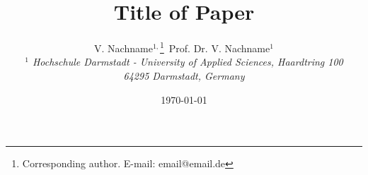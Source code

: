 \documentclass[a4paper,10pt,notitlepage,twocolumn,oneside]{article}
\begin{document}
\title{Title of Paper}
\author{V. Nachname$^{1,}$\thanks{Corresponding author. E-mail: email@email.de}\, Prof. Dr. V. Nachname$^1$\\
\emph{$^1$ Hochschule Darmstadt - University of Applied Sciences,
Haardtring 100}\\
\emph{64295 Darmstadt, Germany}
}

\date{\today} %

\maketitle











\end{document}

